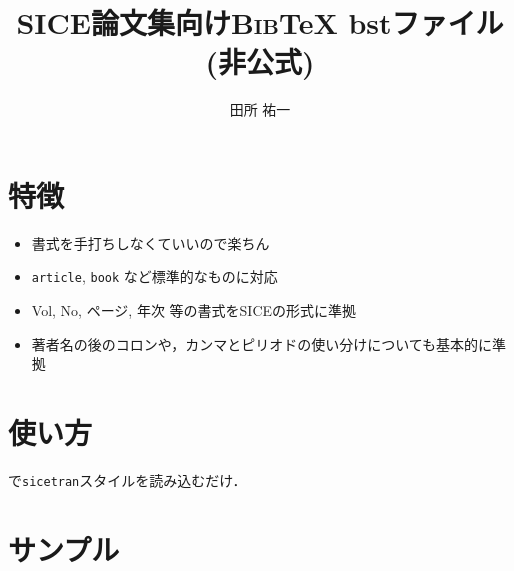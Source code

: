 \documentclass[a4paper,usejistfm]{jarticle}
\begin{document}
\title{SICE論文集向け{\textsc{Bib}\TeX} bstファイル\\(非公式)}
\author{田所 祐一}
\maketitle
\section{特徴}
\begin{itemize}
	\item 書式を手打ちしなくていいので楽ちん
	\item \texttt{article}, \texttt{book} など標準的なものに対応
	\item Vol, No, ページ, 年次 等の書式をSICEの形式に準拠
	\item 著者名の後のコロンや，カンマとピリオドの使い分けについても基本的に準拠
\end{itemize}

\section{使い方}
\begin{center}
	\verb||
\end{center}
で\texttt{sicetran}スタイルを読み込むだけ．

\section{サンプル}


\nocite{*}
\end{document}
